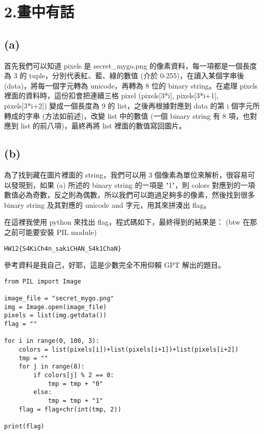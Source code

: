 \documentclass[12pt]{article}
\title{\mytitle}
\author{\textbf{\myauthor}}
\date{\today}
\begin{document}
\onehalfspacing
\maketitle

\section*{2.畫中有話}
\subsection*{(a)}
首先我們可以知道 pixels 是 secret\_mygo.png 的像素資料，每一項都是一個長度為 3 的 tuple，分別代表紅、藍、綠的數值 (介於 0-255)，在讀入某個字串後 (data)，將每一個字元轉為 unicode，再轉為 8 位的 binary string。在處理 pixels 裡面的資料時，這份扣會把連續三格 pixel (pixels[3*i], pixels[3*i+1], pixels[3*i+2]) 變成一個長度為 9 的 list，之後再根據對應到 data 的第 i 個字元所轉成的字串 (方法如前述)，改變 list 中的數值 (一個 binary string 有 8 項，也對應到 list 的前八項)，最終再將 list 裡面的數值寫回圖片。
\subsection*{(b)}
為了找到藏在圖片裡面的 string，我們可以用 3 個像素為單位來解析，很容易可以發現到，如果 (a) 所述的 binary string 的一項是 "1"，則 colors 對應到的一項數值必為奇數，反之則為偶數，所以我們可以跑過足夠多的像素，然後找到很多 binary string 及其對應的 unicode and 字元，用其來拼湊出 flag。

在這裡我使用 python 來找出 flag，程式碼如下，最終得到的結果是： (btw 在那之前可能要安裝 PIL module)

{\centering\verb|HW12{S4KiCh4n_sakiCHAN_S4k1ChaN}|\par}

參考資料是我自己，好耶，這是少數完全不用仰賴 GPT 解出的題目。
\begin{verbatim}
from PIL import Image

image_file = "secret_mygo.png"
img = Image.open(image_file)
pixels = list(img.getdata())
flag = ""

for i in range(0, 100, 3):
    colors = list(pixels[i])+list(pixels[i+1])+list(pixels[i+2])
    tmp = ""
    for j in range(8):
        if colors[j] % 2 == 0:
            tmp = tmp + "0"
        else:
            tmp = tmp + "1"
    flag = flag+chr(int(tmp, 2))

print(flag)
\end{verbatim}
\end{document}
